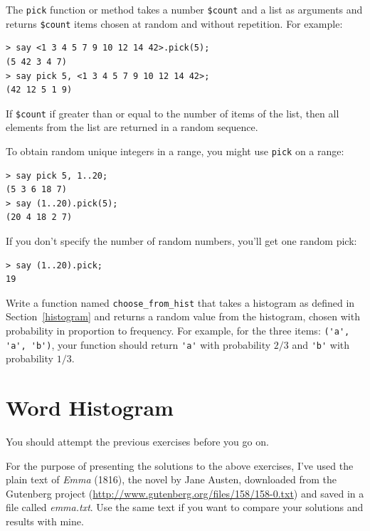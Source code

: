 The {\tt pick} function or method takes a number \verb'$count'  and a list as arguments and returns \verb'$count' items chosen at 
random and without repetition. For example:

\begin{verbatim}
> say <1 3 4 5 7 9 10 12 14 42>.pick(5);
(5 42 3 4 7)
> say pick 5, <1 3 4 5 7 9 10 12 14 42>;
(42 12 5 1 9)
\end{verbatim}

If \verb'$count' if greater than or equal to the number of 
items of the list, then all elements from the list are returned 
in a random sequence.

To obtain random unique integers in a range, you might use 
{\tt pick} on a range:

\begin{verbatim}
> say pick 5, 1..20;
(5 3 6 18 7)
> say (1..20).pick(5);
(20 4 18 2 7)
\end{verbatim}

If you don't specify the number of random numbers, you'll get one 
random pick:

\begin{verbatim}
> say (1..20).pick;
19
\end{verbatim}
%


\begin{exercise}

Write a function named \verb"choose_from_hist" that takes
a histogram as defined in Section~\ref{histogram} and returns a 
random value from the histogram, chosen with probability
in proportion to frequency.  For example, for the three 
items: \verb"('a', 'a', 'b')", your function should 
return \verb"'a'" with probability $2/3$ and \verb"'b'" 
with probability $1/3$.
\end{exercise}


\section{Word Histogram}

You should attempt the previous exercises before you go on.

For the purpose of presenting the solutions to the above 
exercises, I've used the plain text of {\em Emma} (1816), the 
novel by Jane Austen, downloaded from the Gutenberg project 
(\url{http://www.gutenberg.org/files/158/158-0.txt}) and 
saved in a file called \emph{emma.txt}. Use the same 
text if you want to compare your solutions and results 
with mine.

